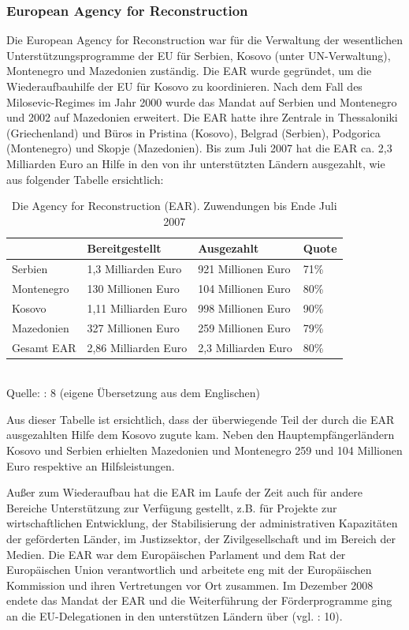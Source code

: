 \subsubsection{European Agency for Reconstruction}
Die European Agency for Reconstruction war für die Verwaltung der wesentlichen Unterstützungsprogramme der EU für Serbien, Kosovo (unter UN-Verwaltung), Montenegro und Mazedonien zuständig. Die EAR wurde gegründet, um die Wiederaufbauhilfe der EU für Kosovo zu koordinieren. Nach dem Fall des Milosevic-Regimes im Jahr 2000 wurde das Mandat auf Serbien und Montenegro und 2002 auf Mazedonien erweitert. Die EAR hatte ihre Zentrale in Thessaloniki (Griechenland) und Büros in Pristina (Kosovo), Belgrad (Serbien), Podgorica (Montenegro) und Skopje (Mazedonien). Bis zum Juli 2007 hat die EAR ca. 2,3 Milliarden Euro an Hilfe in den von ihr unterstützten Ländern ausgezahlt, wie aus folgender Tabelle ersichtlich:
\begin{table}[H]
\center
\caption{Die Agency for Reconstruction (EAR). Zuwendungen bis Ende Juli 2007}
\small{
\begin{tabular}{|L{20mm}|R{36mm}|R{36mm}|R{16mm}|}\hline
&
Bereitgestellt&
Ausgezahlt&
Quote\\\hline
Serbien&
1,3 Milliarden Euro&
921 Millionen Euro&
71\%\\\hline
Montenegro&
130 Millionen Euro&
104 Millionen Euro&
80\%\\\hline
Kosovo&
1,11 Milliarden Euro&
998 Millionen Euro&
90\%\\\hline
Mazedonien&
327 Millionen Euro&
259 Millionen Euro&
79\%\\\hline
Gesamt EAR&
2,86 Milliarden Euro&
2,3 Milliarden Euro&
80\%\\\hline
\end{tabular}
}\\
\scriptsize{Quelle: \cite{zink}: 8 (eigene Übersetzung aus dem Englischen)}
\end{table}


Aus dieser Tabelle ist ersichtlich, dass der überwiegende Teil der durch die EAR ausgezahlten Hilfe dem Kosovo zugute kam. Neben den Hauptempfängerländern Kosovo und Serbien erhielten Mazedonien und Montenegro 259 und 104 Millionen Euro respektive an Hilfsleistungen.\par
Außer zum Wiederaufbau hat die EAR im Laufe der Zeit auch für andere Bereiche Unterstützung zur Verfügung gestellt, z.B. für Projekte zur wirtschaftlichen Entwicklung, der Stabilisierung der administrativen Kapazitäten der geförderten Länder, im Justizsektor, der Zivilgesellschaft und im Bereich der Medien. Die EAR war dem Europäischen Parlament und dem Rat der Europäischen Union verantwortlich und arbeitete eng mit der Europäischen Kommission und ihren Vertretungen vor Ort zusammen. Im Dezember 2008 endete das Mandat der EAR und die Weiterführung der Förderprogramme ging an die EU-Delegationen in den unterstützen Ländern über (vgl. \cite{zink}: 10).

